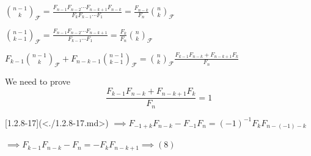 \documentclass{article}
\begin{document}
$\binom{n-1}{k}_{\mathcal{F}} = \frac{F_{n-1}F_{n-2} \cdots F_{n-k+1}F_{n-k}}{F_k F_{k-1} \cdots F_1} = \frac{F_{n-k}}{F_n} \binom{n}{k}_{\mathcal{F}}$

$\binom{n-1}{k-1}_{\mathcal{F}} = \frac{F_{n-1}F_{n-2} \cdots F_{n-k+1}}{F_{k-1} \cdots F_1} = \frac{F_{k}}{F_n} \binom{n}{k}_{\mathcal{F}}$

$F_{k-1}\binom{n-1}{k}_{\mathcal{F}} + F_{n-k-1} \binom{n-1}{k-1}_{\mathcal{F}} = \binom{n}{k}_{\mathcal{F}} \frac{F_{k-1}F_{n-k} + F_{n-k+1}F_{k}}{F_n}$

We need to prove
\[\frac{F_{k-1}F_{n-k} + F_{n-k+1}F_{k}}{F_n} = 1 \tag{*}\label{eq:star}\]

[1.2.8-17](<./1.2.8-17.md>) $\implies F_{-1+k}F_{n-k} - F_{-1}F_n = (-1)^{-1}F_kF_{n-(-1)-k}$

$\implies F_{k-1}F_{n-k} - F_n = -F_kF_{n-k+1} \implies (8)$
\end{document}
